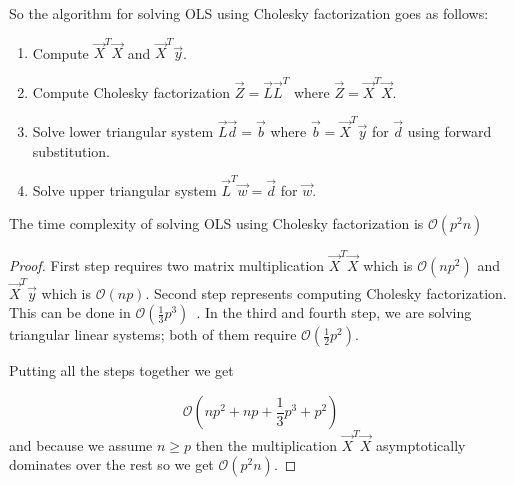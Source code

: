 
So the algorithm for solving OLS using Cholesky factorization goes as follows:
\begin{enumerate}
  \item Compute $\vec{X}^T\vec{X}$ and   $\vec{X}^T\vec{y}$.
  \item Compute Cholesky factorization $\vec{Z} = \vec{L}\vec{L}^T$ where $\vec{Z} = \vec{X}^T\vec{X}$.
  \item Solve lower triangular system $\vec{L}\vec{d} = \vec{b}$  where $ \vec{b} = \vec{X}^T\vec{y}$  for $\vec{d}$ using forward substitution.
  \item Solve upper triangular system $ \vec{L}^T\vec{w} = \vec{d}$ for $\vec{w}$.
\end{enumerate}

\begin{observation} \label{time:complexity:ols:cholesky}
    The time complexity of solving OLS using Cholesky factorization is $\mathcal{O}(p^2n)$
\end{observation}

\begin{proof}
    First step requires two matrix multiplication $\vec{X}^T\vec{X}$ which is $\mathcal{O}(np^2)$ and  $\vec{X}^T\vec{y}$ which is $\mathcal{O}(np)$.
    Second step represents computing Cholesky factorization. This can be done in $\mathcal{O}(\frac{1}{3}p^3)$~\cite{krishnamoorthy2013matrix}.
    In the third and fourth step, we are solving triangular linear systems; both of them require  $\mathcal{O}(\frac{1}{2}p^2)$.

    Putting all the steps together we get  

    \begin{equation} 
        \mathcal{O}(np^2 + np + \frac{1}{3}p^3 + p^2)
    \end{equation}
    and because we assume $n \geq p$ then the multiplication $\vec{X}^T\vec{X}$ asymptotically dominates over the rest so we get $\mathcal{O}(p^2n)$.
\end{proof}


